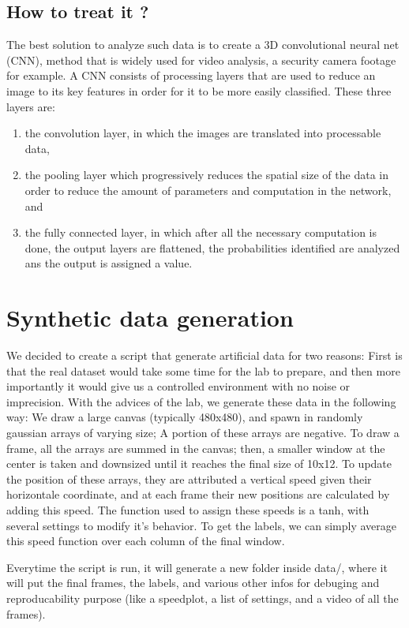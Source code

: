 \documentclass[10pt,conference]{IEEEtran}
\begin{document}
\subsection{How to treat it ?}
The best solution to analyze such data is to create a 3D convolutional neural net (CNN), method that is widely used for video analysis, a security camera footage for example. A CNN consists of processing layers that are used to reduce an image to its key features in order for it to be more easily classified. These three layers are:
\begin{enumerate}
  \item the convolution layer, in which the images are translated into processable data,
  \item the pooling layer which progressively reduces the spatial size of the data in order to reduce the amount of parameters and computation in the network, and
  \item the fully connected layer, in which after all the necessary computation is done, the output layers are flattened, the probabilities identified are analyzed ans the output is assigned a value.
\end{enumerate}

\section{Synthetic data generation}
We decided to create a script that generate artificial data for two reasons: First is that the real dataset would take some time for the lab to prepare, and then more importantly it would give us a controlled environment with no noise or imprecision. 
With the advices of the lab, we generate these data in the following way: We draw a large canvas (typically 480x480), and spawn in randomly gaussian arrays of varying size; A portion of these arrays are negative. To draw a frame, all the arrays are summed in the canvas; then, a smaller window at the center is taken and downsized until it reaches the final size of 10x12.
To update the position of these arrays, they are attributed a vertical speed given their horizontale coordinate, and at each frame their new positions are calculated by adding this speed. The function used to assign these speeds is a tanh, with several settings to modify it's behavior. 
To get the labels, we can simply average this speed function over each column of the final window.

Everytime the script is run, it will generate a new folder inside data/, where it will put the final frames, the labels, and various other infos for debuging and reproducability purpose (like a speedplot, a list of settings, and a video of all the frames).
\end{document}
